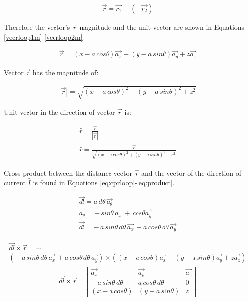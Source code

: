 \documentclass{ximera}
\begin{document}
\begin{eqnarray}
\vec{r}=\vec{r_1} + (-\vec{r_2})
\end{eqnarray}


Therefore the vector's $\vec{r}$  magnitude and the unit vector are shown in Equations \ref{vecrloop1m}-\ref{vecrloop2m}.


\begin{eqnarray}
\vec{r}= (x -  a \,cos{\theta}) \vec{a_x} +(y - a \,sin{\theta}) \vec{a_y} +z \vec{a_z}
\end{eqnarray}

Vector $\vec{r}$ has the magnitude of:


\begin{eqnarray}
|\vec{r}|= \sqrt{(x - a \,cos{\theta})^2 +(y - a \,sin{\theta})^2 +z ^2}\label{vecrloop1m}
\end{eqnarray}

Unit vector in the direction of vector $\vec{r}$ is:


\begin{eqnarray}
\hat{r}= \frac{\vec{r}}{|\vec{r}|} \\
\hat{r}=\frac{\vec{r}}{\sqrt{(x - a \, cos{\theta})^2 +(y - a  \, sin{\theta})^2 +z^2}}\label{vecrloop2m}
\end{eqnarray}

Cross product between the distance vector $\vec{r}$ and the vector of the direction of current $\hat{I}$ is found in Equations \ref{eq:cprloop}-\ref{eq:product}.

\begin{eqnarray}
\vec{dl}=  a\,  d\theta \, \vec{ a_{\theta}} \\
a_{\theta}= -\, sin\theta \, a_{x} \, + \, cos\theta \vec{a_y}  \\
\vec{dl}= -\, a \,  sin\theta \, d \theta \, \vec{a_{x}} \, + a \, cos \theta\,  d \theta \,\vec{a_y} 
\end{eqnarray}

\begin{eqnarray}\label{eq:cprloop} 
\vec{dl} \times \vec{r} = \cdots \nonumber \\ 
 \left( -\, a \,  sin\theta \, d \theta \, \vec{a_{x}} \, + a \, cos \theta\,  d \theta \,\vec{a_y}\right)  \times \left(  (x -  a \,cos{\theta}) \vec{a_x} +(y - a \,sin{\theta}) \vec{a_y} +z \vec{a_z} \right) 
\end{eqnarray}
\begin{eqnarray}\label{eq:product}
\vec{dl} \times \vec{r} =\left| \begin{array}{ccc}
\vec{a_x} & \vec{a_y} & \vec{a_z} \\
   -\, a \,  sin\theta \, d \theta &  a \, cos \theta\,  d \theta & 0 \\
 (x -  a \,cos{\theta}) & (y - a \,sin{\theta})  & z \end{array} \right| 
\end{eqnarray}
\end{document}
